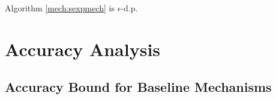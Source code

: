 \documentclass{article}
\begin{document}
\begin{thm}
  Algorithm \ref{mech:sexpmech} is $\epsilon$-d.p.
\end{thm}
\section{Accuracy Analysis}

\subsection{Accuracy Bound for Baseline Mechanisms}

\end{document}
